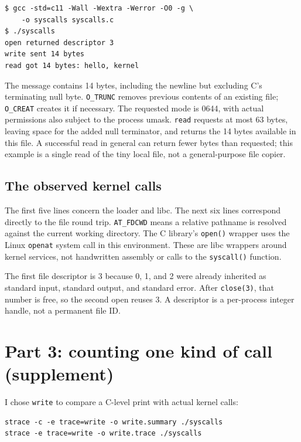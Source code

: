 \documentclass[12pt]{article}
\begin{document}
\begin{lstlisting}
$ gcc -std=c11 -Wall -Wextra -Werror -O0 -g \
    -o syscalls syscalls.c
$ ./syscalls
open returned descriptor 3
write sent 14 bytes
read got 14 bytes: hello, kernel
\end{lstlisting}

The message contains 14 bytes, including the newline but excluding C's
terminating null byte. \texttt{O\_TRUNC} removes previous contents of an
existing file; \texttt{O\_CREAT} creates it if necessary. The requested mode
is 0644, with actual permissions also subject to the process umask.
\texttt{read} requests at most 63 bytes, leaving space for the added null
terminator, and returns the 14 bytes available in this file. A successful
read in general can return fewer bytes than requested; this example is a
single read of the tiny local file, not a general-purpose file copier.

\clearpage
\subsection{The observed kernel calls}

The first five lines concern the loader and libc. The next six lines
correspond directly to the file round trip. \texttt{AT\_FDCWD} means a
relative pathname is resolved against the current working directory.
The C library's \texttt{open()} wrapper uses the Linux \texttt{openat}
system call in this environment. These are libc wrappers around kernel
services, not handwritten assembly or calls to the \texttt{syscall()}
function.

The first file descriptor is 3 because 0, 1, and 2 were already inherited
as standard input, standard output, and standard error. After
\texttt{close(3)}, that number is free, so the second open reuses 3.
A descriptor is a per-process integer handle, not a permanent file ID.

\clearpage
\section{Part 3: counting one kind of call (supplement)}
I chose \texttt{write} to compare a C-level print with actual kernel calls:
\begin{lstlisting}
strace -c -e trace=write -o write.summary ./syscalls
strace -e trace=write -o write.trace ./syscalls
\end{lstlisting}

\end{document}
